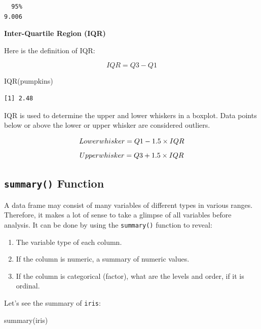 \documentclass[
  letterpaper,
  DIV=11,
  numbers=noendperiod]{scrreprt}
\newenvironment{Shaded}{\begin{snugshade}}{\end{snugshade}}
\newcommand{\FunctionTok}[1]{\textcolor[rgb]{0.28,0.35,0.67}{#1}}
\newcommand{\NormalTok}[1]{\textcolor[rgb]{0.00,0.23,0.31}{#1}}
\begin{document}
\begin{verbatim}
  95% 
9.006 
\end{verbatim}

\textbf{Inter-Quartile Region (IQR)}

Here is the definition of IQR:

\[IQR = Q3 - Q1\]

\begin{Shaded}
\begin{Highlighting}[]
\FunctionTok{IQR}\NormalTok{(pumpkins)}
\end{Highlighting}
\end{Shaded}

\begin{verbatim}
[1] 2.48
\end{verbatim}

IQR is used to determine the upper and lower whiskers in a boxplot. Data
points below or above the lower or upper whisker are considered
outliers.

\[Lower\space whisker = Q1 - 1.5\times{IQR}\]
\[Upper\space whisker = Q3 + 1.5\times{IQR}\]

\subsection{\texorpdfstring{\texttt{summary()}
Function}{summary() Function}}\label{sec-summary-function}

A data frame may consist of many variables of different types in various
ranges. Therefore, it makes a lot of sense to take a glimpse of all
variables before analysis. It can be done by using the
\texttt{summary()} function to reveal:

\begin{enumerate}
\def\labelenumi{\arabic{enumi}.}
\item
  The variable type of each column.
\item
  If the column is numeric, a summary of numeric values.
\item
  If the column is categorical (factor), what are the levels and order,
  if it is ordinal.
\end{enumerate}

Let's see the summary of \texttt{iris}:

\begin{Shaded}
\begin{Highlighting}[]
\FunctionTok{summary}\NormalTok{(iris)}
\end{Highlighting}
\end{Shaded}
\end{document}
